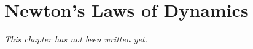 \chapter{Newton's Laws of Dynamics}\label{ch:b1:newton-dynamics}


\emph{This chapter has not been written yet.}
